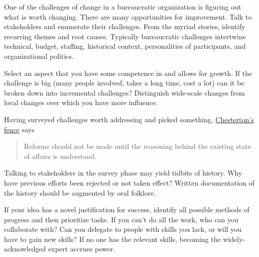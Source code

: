 One of the challenges of change in a bureaucratic organization is figuring out what is worth changing. There are many opportunities for improvement. Talk to stakeholders and enumerate their challenges.
From the myriad stories, identify recurring themes and root causes. Typically bureaucratic challenges intertwine technical, budget, staffing, historical context, personalities of participants, and organizational politics. 

Select an aspect that you have some competence in and allows for growth. If the challenge is big (many people involved, takes a long time, cost a lot) can it be broken down into incremental challenges? Distinguish wide-scale changes from local changes over which you have more influence.

Having surveyed challenges worth addressing and picked something, 
\href{https://en.wikipedia.org/wiki/Wikipedia:Chesterton\%27s_fence}{Chesterton's fence} says
\begin{quote}
Reforms should not be made until the reasoning behind the existing state of affairs is understood.
\end{quote}
Talking to stakeholders in the survey phase may yield tidbits of history. Why have previous efforts been rejected or not taken effect? Written documentation of the history should be augmented by oral folklore. 

If your idea has a novel justification for success, identify all possible methods of progress and then prioritize tasks. If you can't do all the work, who can you collaborate with? Can you delegate to people with skills you lack, or will you have to gain new skills? 
If no one has the relevant skills, becoming the widely-acknowledged expert accrues power. 


